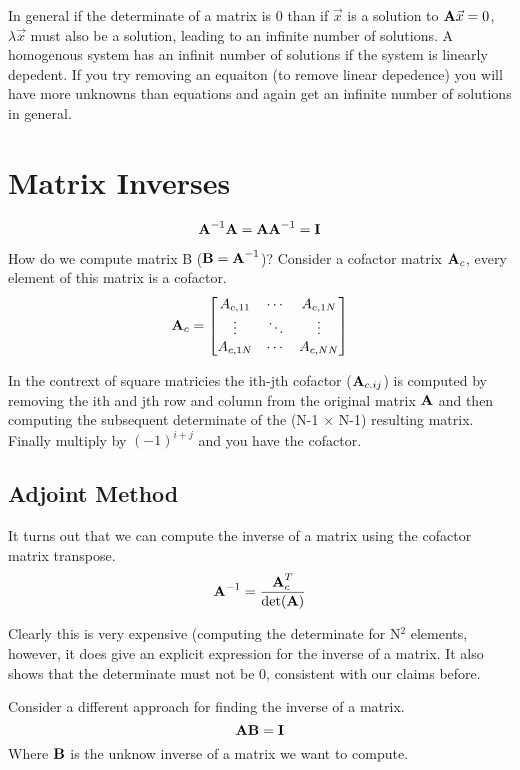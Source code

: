 \documentclass{article}
\newcommand{\be}{\begin{equation}}
\newcommand{\ee}{\end{equation}}
\newcommand{\bA}{\mbox{\bf A}}
\newcommand{\bB}{\mbox{\bf B}}
\newcommand{\bI}{\mbox{\bf I}}
\begin{document}
In general if the determinate of a matrix is 0 than if $\vec{x}$ is a solution to $\bA\vec{x}=0$, $\lambda\vec{x}$ must also be a solution, leading to an infinite number of solutions.
A homogenous system has an infinit number of solutions if the system is linearly depedent.
If you try removing an equaiton (to remove linear depedence) you will have more unknowns than equations and again get an infinite number of solutions in general.

\section{Matrix Inverses}
\be
\bA^{-1}\bA =\bA\bA^{-1} = \bI
\ee

How do we compute matrix B ($\bB=\bA^{-1}$)?
Consider a cofactor matrix $\bA_c$, every element of this matrix is a cofactor.
\be
\bA_c =
\begin{bmatrix}
    A_{c,11}  & \dotsb &  A_{c,1N} \\
    \vdots  & \ddots &  \vdots \\
    A_{c,1N}  & \dotsb &  A_{c,NN}
\end{bmatrix}
\ee

In the contrext of square matricies the ith-jth cofactor ($\bA_{c.ij}$) is computed by removing the ith and jth row and column from the original matrix $\bA$ and then computing the subsequent determinate of the (N-1 $\times$ N-1) resulting matrix.
Finally multiply by $(-1)^{i+j}$ and you have the cofactor.

\subsection*{Adjoint Method}
It turns out that we can compute the inverse of a matrix using the cofactor matrix transpose.
\be
\bA^{-1} = \frac{\bA_c^{T}}{\det(\bA)}
\ee

Clearly this is very expensive (computing the determinate for N$^2$ elements, however, it does give an explicit expression for the inverse of a matrix.
It also shows that the determinate must not be 0, consistent with our claims before.

Consider a different approach for finding the inverse of a matrix.
\be
\bA\bB =\bI
\ee
Where $\bB$ is the unknow inverse of a matrix we want to compute.
\end{document}
